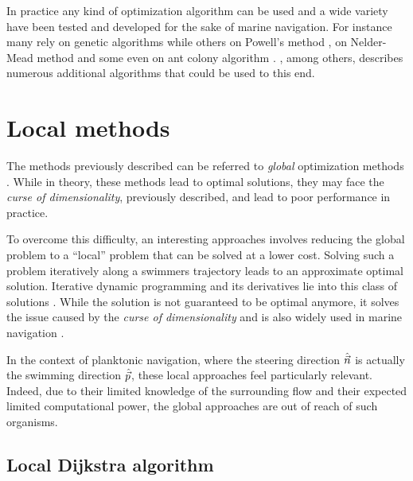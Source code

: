 In practice any kind of optimization algorithm can be used and a wide variety have been tested and developed for the sake of marine navigation.
For instance many rely on genetic algorithms \citep{avgouleas2014fuel, vettor2016development} while others on Powell's method \citep{kobayashi2017advanced}, on Nelder-Mead method \citep{pipchenko201120} and some even on ant colony algorithm \citep{tsou2013ant}.
\citet{brownlee2011clever}, among others, describes numerous additional algorithms that could be used to this end.

\section{Local methods}

The methods previously described can be referred to \textit{global} optimization methods \citep{todorov2009iterative}.
While in theory, these methods lead to optimal solutions, they may face the \textit{curse of dimensionality},  previously described, and lead to poor performance in practice.

To overcome this difficulty, an interesting approaches involves reducing the global problem to a ``local'' problem that can be solved at a lower cost.
Solving such a problem iteratively along a swimmers trajectory leads to an approximate optimal solution.
Iterative dynamic programming and its derivatives lie into this class of solutions \citep{todorov2009iterative, luus2019iterative}.
While the solution is not guaranteed to be optimal anymore, it solves the issue caused by the \textit{curse of dimensionality} and is also widely used in marine navigation \citep{avgouleas2008optimal, avgouleas2014fuel}.

In the context  of planktonic navigation, where the steering direction $\hat{\vec{n}}$ is actually the swimming direction $\hat{\vec{p}}$, these local approaches feel particularly relevant.
Indeed, due to their limited knowledge of the surrounding flow and their expected limited computational power, the global approaches are out of reach of such organisms.

\subsection{Local Dijkstra algorithm}

